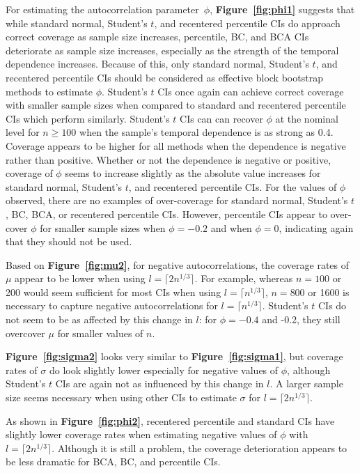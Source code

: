 \documentclass[10pt]{article}
\begin{document}
For estimating the autocorrelation parameter~$\phi$, 
\textbf{Figure~\ref{fig:phi1}} suggests that while standard normal, Student's $t$, and 
recentered percentile CIs do approach correct coverage as sample size increases, 
percentile, BC, and BCA CIs deteriorate as sample size increases, especially as 
the strength of the temporal dependence increases. Because of this, only 
standard normal, Student's $t$, and recentered percentile CIs should be considered as 
effective block bootstrap methods to estimate $\phi$. Student's $t$ CIs once 
again can achieve correct coverage with smaller sample sizes when compared to 
standard and recentered percentile CIs which perform similarly. Student's $t$ 
CIs can can recover $\phi$ at the nominal level for $n \geq 100$ when the 
sample's temporal dependence is as strong as 0.4. Coverage appears to be higher 
for all methods when the dependence is negative rather than positive. Whether or 
not the dependence is negative or positive, coverage of $\phi$ seems to increase 
slightly as the absolute value increases for standard normal, Student's $t$, and 
recentered percentile CIs. For the values of $\phi$ observed, there are no 
examples of over-coverage for standard normal, Student's $t$, BC, BCA, or recentered 
percentile CIs. However, percentile CIs appear to over-cover $\phi$ for smaller 
sample sizes when $\phi = -0.2$ and when $\phi = 0$, indicating again that they 
should not be used.

Based on \textbf{Figure~\ref{fig:mu2}}, for negative autocorrelations, the 
coverage 
rates of $\mu$ appear to be lower when
using $l = \lceil 2n^{1/3} \rceil$. For example, whereas $n = 100$ or 200 
would seem sufficient for most CIs when using $l = \lceil n^{1/3} \rceil$, 
$n = 800$ or 1600 is necessary to capture negative autocorrelations for 
$l = \lceil n^{1/3} \rceil$. Student's $t$ CIs do not seem to be as affected
by this change in $l$: for $\phi = -0.4$ and -0.2, they still overcover $\mu$
for smaller values of $n$. 

\textbf{Figure~\ref{fig:sigma2}} looks very similar to 
\textbf{Figure~\ref{fig:sigma1}}, but coverage rates of $\sigma$ do look 
slightly lower
especially for negative values of $\phi$, although Student's $t$ CIs are again
not as influenced by this change in $l$. A larger sample size seems necessary
when using other CIs to estimate $\sigma$ for $l = \lceil 2n^{1/3} \rceil$.

As shown in \textbf{Figure~\ref{fig:phi2}},
recentered percentile and standard CIs have slightly lower coverage rates when
estimating negative values of $\phi$ with $l = \lceil 2n^{1/3} \rceil$. 
Although it is still a problem, the coverage deterioration appears to be less 
dramatic for BCA,
BC, and percentile CIs.
\end{document}
